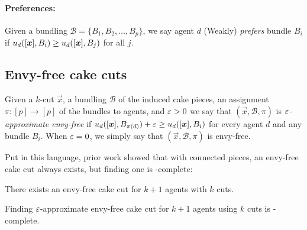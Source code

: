 \paragraph{Preferences:}
Given a bundling $\mathcal{B} = \{B_1, B_2, \ldots, B_{p}\}$, we say agent $d$ (Weakly) {\em prefers} bundle $B_i$ if $u_d([\boldsymbol{x}], B_i) \geq u_d([\boldsymbol{x}], B_{j})$ for all $j$.



\subsection{Envy-free cake cuts}

\begin{definition}
    Given a $k$-cut $\vec{x}$, a bundling $\mathcal{B}$ of the induced cake pieces, an assignment $\pi: [p] \rightarrow [p]$ of the bundles to agents, and $\varepsilon>0$ we say that  $(\vec{x}, \mathcal{B}, \pi)$ is  {\em $\varepsilon$-approximate envy-free} if $u_d([\boldsymbol{x}], B_{\pi(d)}) + \varepsilon \geq u_d([\boldsymbol{x}], B_i)$  for every agent $d$ and any bundle $B_i$. When $\varepsilon = 0$, we simply say that $(\vec{x}, \mathcal{B}, \pi)$ is  envy-free.
\end{definition}

Put in this language, prior work showed that with connected pieces, an envy-free cake cut always exists, but finding one is \PPAD-complete:





\begin{theorem}\label{thm:cake-cutting-exists}
    There exists an envy-free cake cut for $k + 1$ agents with $k$ cuts.
\end{theorem}



\begin{theorem}\label{thm:previous-result}
    Finding $\varepsilon$-approximate envy-free cake cut for $k + 1$ agents using $k$ cuts is \PPAD-complete.
\end{theorem}


